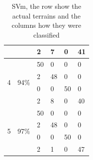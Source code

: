 \documentclass[USenglish]{ifimaster}  %
\begin{document}
\begin{table}[h]
\begin{tabular}{@{}llllll@{}}
		\multicolumn{1}{l|}{} & \multicolumn{1}{l|}{} & \multicolumn{1}{l|}{2} & \multicolumn{1}{l|}{7} & \multicolumn{1}{l|}{0} & 41 \\ \midrule
		\multicolumn{1}{l|}{\multirow{4}{*}{4}} & \multicolumn{1}{l|}{\multirow{4}{*}{94\%}} & \multicolumn{1}{l|}{50} & \multicolumn{1}{l|}{0} & \multicolumn{1}{l|}{0} & 0 \\ \cmidrule(l){3-6} 
		\multicolumn{1}{l|}{} & \multicolumn{1}{l|}{} & \multicolumn{1}{l|}{2} & \multicolumn{1}{l|}{48} & \multicolumn{1}{l|}{0} & 0 \\ \cmidrule(l){3-6} 
		\multicolumn{1}{l|}{} & \multicolumn{1}{l|}{} & \multicolumn{1}{l|}{0} & \multicolumn{1}{l|}{0} & \multicolumn{1}{l|}{50} & 0 \\ \cmidrule(l){3-6} 
		\multicolumn{1}{l|}{} & \multicolumn{1}{l|}{} & \multicolumn{1}{l|}{2} & \multicolumn{1}{l|}{8} & \multicolumn{1}{l|}{0} & 40 \\ \midrule
		\multicolumn{1}{l|}{\multirow{4}{*}{5}} & \multicolumn{1}{l|}{\multirow{4}{*}{97\%}} & \multicolumn{1}{l|}{50} & \multicolumn{1}{l|}{0} & \multicolumn{1}{l|}{0} & 0 \\ \cmidrule(l){3-6} 
		\multicolumn{1}{l|}{} & \multicolumn{1}{l|}{} & \multicolumn{1}{l|}{2} & \multicolumn{1}{l|}{48} & \multicolumn{1}{l|}{0} & 0 \\ \cmidrule(l){3-6} 
		\multicolumn{1}{l|}{} & \multicolumn{1}{l|}{} & \multicolumn{1}{l|}{0} & \multicolumn{1}{l|}{0} & \multicolumn{1}{l|}{50} & 0 \\ \cmidrule(l){3-6} 
		\multicolumn{1}{l|}{} & \multicolumn{1}{l|}{} & \multicolumn{1}{l|}{2} & \multicolumn{1}{l|}{1} & \multicolumn{1}{l|}{0} & 47 \\ \bottomrule
	\end{tabular}
	\caption{SVm, the row show the actual terrains and the columns how they were classified}
	\label{svmexp}
\end{table}
\FloatBarrier
\end{document}
